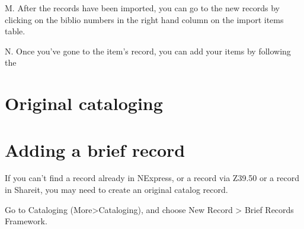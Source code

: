 \documentclass[letterpaper,10pt,english]{sphinxmanual}
\begin{document}
M. After the records have been imported, you can go to the new records
by clicking on the biblio numbers in the right hand column on the import
items table.

N. Once you’ve gone to the item’s record, you can add your items by
following the 



\chapter{Original cataloging}
\label{\detokenize{original-cataloging/README:original-cataloging}}\label{\detokenize{original-cataloging/README::doc}}

\chapter{Adding a brief record}
\label{\detokenize{original-cataloging/adding-a-brief-record:adding-a-brief-record}}\label{\detokenize{original-cataloging/adding-a-brief-record::doc}}
If you can’t find a record already in NExpress, or a record via Z39.50
or a record in Shareit, you may need to create an original catalog
record.

Go to Cataloging (More\textendash{}\textgreater{}Cataloging), and choose New Record \textendash{}\textgreater{} Brief
Records Framework.
\end{document}

